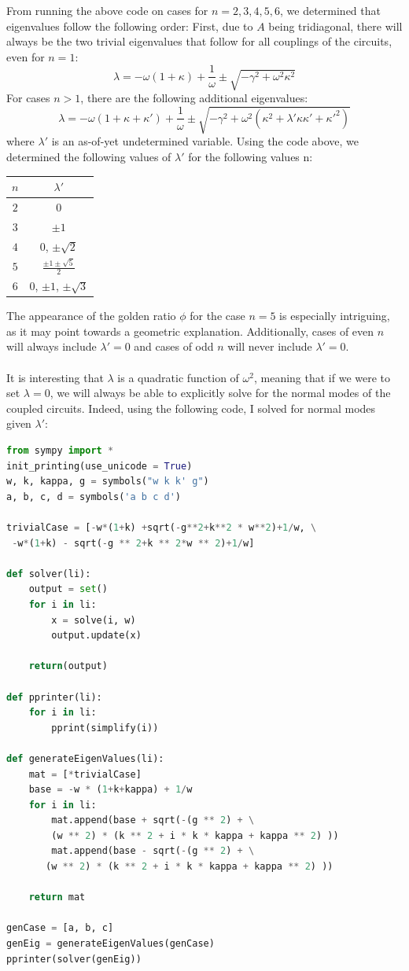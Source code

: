 \documentclass[11pt]{article}
\begin{document}
From running the above code on cases for $n=2,3,4,5,6$, we determined that eigenvalues follow the following order:
First, due to $A$ being tridiagonal, there will always be the two trivial eigenvalues that follow for all couplings of the circuits, even for $n=1$:
\[
\lambda = -\omega (1+\kappa) + \frac{1}{\omega} \pm \sqrt{-\gamma^2 +\omega^2 \kappa^2}
\]
For cases $n > 1$, there are the following additional eigenvalues:
\[
\lambda = -\omega (1+\kappa + \kappa') + \frac{1}{\omega} \pm \sqrt{-\gamma^2 + \omega^2 (\kappa^2 + \lambda' \kappa \kappa' + \kappa'^2)}
\]
where $\lambda'$ is an as-of-yet undetermined variable. Using the code above, we determined the following values of $\lambda'$ for the following values n:
\begin{center}
	\begin{tabular}{ c | c}
		$n$ & $\lambda'$ \\
		\hline
		$2$ & $0$ \\
		$3$ & $\pm 1$\\
		$4$ & $0$, $\pm \sqrt{2}$\\
		$5$ & $\frac{\pm 1 \pm \sqrt{5}}{2}$\\
		$6$ & $0$, $\pm 1$, $\pm \sqrt{3}$
	\end{tabular}
\end{center}

The appearance of the golden ratio $\phi$ for the case $n=5$ is especially intriguing, as it may point towards a geometric explanation. Additionally, cases of even $n$ will always include $\lambda' = 0$ and cases of odd $n$ will never include $\lambda' = 0$.
\\
\\
It is interesting that $\lambda$ is a quadratic function of $\omega^2$, meaning that if we were to set $\lambda = 0$, we will always be able to explicitly solve for the normal modes of the coupled circuits. Indeed, using the following code, I solved for normal modes given $\lambda'$:

\begin{lstlisting}[language=Python]
from sympy import *
init_printing(use_unicode = True)
w, k, kappa, g = symbols("w k k' g")
a, b, c, d = symbols('a b c d')

trivialCase = [-w*(1+k) +sqrt(-g**2+k**2 * w**2)+1/w, \
 -w*(1+k) - sqrt(-g ** 2+k ** 2*w ** 2)+1/w]

def solver(li):
    output = set()
    for i in li:
        x = solve(i, w)
        output.update(x)
    
    return(output)

def pprinter(li):
    for i in li:
        pprint(simplify(i))

def generateEigenValues(li):
    mat = [*trivialCase]
    base = -w * (1+k+kappa) + 1/w
    for i in li:
        mat.append(base + sqrt(-(g ** 2) + \
        (w ** 2) * (k ** 2 + i * k * kappa + kappa ** 2) ))
        mat.append(base - sqrt(-(g ** 2) + \
       (w ** 2) * (k ** 2 + i * k * kappa + kappa ** 2) ))
    
    return mat

genCase = [a, b, c]
genEig = generateEigenValues(genCase)
pprinter(solver(genEig))
\end{lstlisting}
\end{document}
